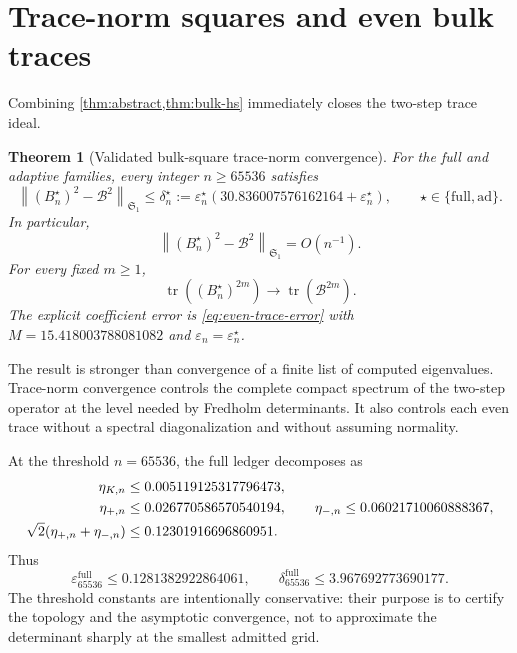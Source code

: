 \documentclass[11pt]{article}
\newtheorem{theorem}{Theorem}[section]
\theoremstyle{definition}
\theoremstyle{remark}
\newcommand{\cB}{\mathcal B}
\newcommand{\norm}[1]{\left\lVert #1\right\rVert}
\newcommand{\tr}{\operatorname{tr}}
\begin{document}
\section{Trace-norm squares and even bulk traces}
\label{sec:trace-norm}

Combining \cref{thm:abstract,thm:bulk-hs} immediately closes the
two-step trace ideal.

\begin{theorem}[Validated bulk-square trace-norm convergence]
\label{thm:bulk-square}
For the full and adaptive families, every integer $n\ge65536$ satisfies
\begin{equation}
 \norm{(B_n^{\star})^2-\cB^2}_{\mathfrak S_1}
 \le\delta_n^{\star}
 :=\varepsilon_n^{\star}
 \left(30.836007576162164+\varepsilon_n^{\star}\right),
 \qquad
 \star\in\{\mathrm{full},\mathrm{ad}\}.
 \label{eq:validated-trace-norm}
\end{equation}
In particular,
\begin{equation}
 \norm{(B_n^{\star})^2-\cB^2}_{\mathfrak S_1}=O(n^{-1}).
 \label{eq:trace-norm-rate}
\end{equation}
For every fixed $m\ge1$,
\begin{equation}
 \tr\!\left((B_n^{\star})^{2m}\right)
 \longrightarrow\tr(\cB^{2m}).
 \label{eq:even-trace-convergence}
\end{equation}
The explicit coefficient error is \eqref{eq:even-trace-error} with
$M=15.418003788081082$ and
$\varepsilon_n=\varepsilon_n^\star$.
\end{theorem}

The result is stronger than convergence of a finite list of computed
eigenvalues.  Trace-norm convergence controls the complete compact spectrum
of the two-step operator at the level needed by Fredholm determinants.  It
also controls each even trace without a spectral diagonalization and
without assuming normality.

At the threshold $n=65536$, the full ledger decomposes as
\begin{align}
 \eta_{K,n}&\le0.005119125317796473,
 \notag\\
 \eta_{+,n}&\le0.026770586570540194,
 \qquad
 \eta_{-,n}\le0.06021710060888367,
 \label{eq:threshold-components}\\
 \sqrt2(\eta_{+,n}+\eta_{-,n})
 &\le0.12301916696860951.
 \notag
\end{align}
Thus
\[
 \varepsilon_{65536}^{\mathrm{full}}
 \le0.1281382922864061,
 \qquad
 \delta_{65536}^{\mathrm{full}}
 \le3.967692773690177.
\]
The threshold constants are intentionally conservative: their purpose is
to certify the topology and the asymptotic convergence, not to approximate
the determinant sharply at the smallest admitted grid.
\end{document}
